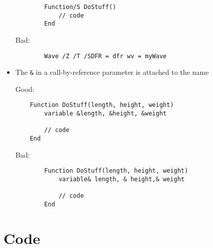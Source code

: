 \documentclass{scrartcl}
\begin{document}
\begin{itemize}
\begin{verbatim}
		Function/S DoStuff()
			// code
		End
	\end{verbatim}
	Bad:
	\begin{verbatim}
		Wave /Z /T /SDFR = dfr wv = myWave
	\end{verbatim}
%	
	\item The \texttt{&} in a call-by-reference parameter is attached to the name\par
	Good:
	\begin{verbatim}
	Function DoStuff(length, height, weight)
		variable &length, &height, &weight
		
		// code
	End
	\end{verbatim}
	Bad:
	\begin{verbatim}
		Function DoStuff(length, height, weight)
			variable& length, & height,& weight
		
			// code
		End
	\end{verbatim}
%
\end{itemize}
%
\section{Code}
%
\end{document}
